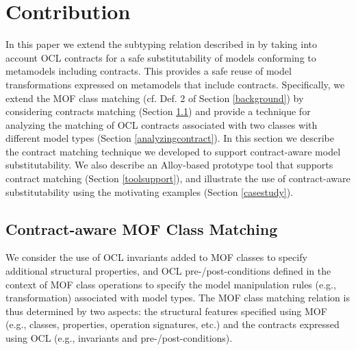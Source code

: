 \section{Contribution}\label{contribution}


In this paper we extend the subtyping relation described in \cite{ecmfa12} by taking into account OCL contracts for a safe substitutability of models conforming to metamodels including contracts. This provides a safe reuse of model transformations expressed on metamodels that include contracts. 
Specifically, we extend the MOF class matching (cf. Def. 2 of Section \ref{background}) by considering contracts matching (Section \ref{classmatching}) and provide a technique for analyzing the matching of OCL contracts associated with two classes with different model types (Section \ref{analyzingcontract}). In this section we describe the contract matching technique we developed to support contract-aware model substitutability. We also describe an Alloy-based prototype tool that supports contract matching (Section \ref{toolsupport}), and illustrate the use of contract-aware substitutability using the motivating examples (Section \ref{casestudy}).    

\subsection{Contract-aware MOF Class Matching}\label{classmatching}

We consider the use of OCL invariants added to MOF classes to specify additional structural properties, and OCL pre-/post-conditions defined in the context of MOF class operations to specify the model manipulation rules (e.g., transformation) associated with model types. 
The MOF class matching relation is thus determined by two aspects: the structural features specified using MOF (e.g., classes, properties, operation signatures, etc.) and the contracts expressed using OCL (e.g., invariants and pre-/post-conditions).  

